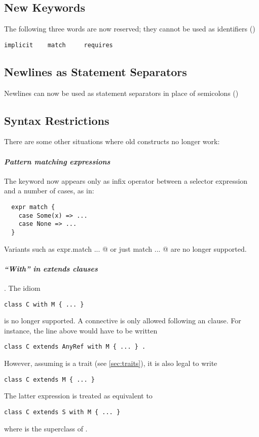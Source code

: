 \subsection*{New Keywords}

The following three words are now reserved; they cannot be used as
identifiers ()
\begin{lstlisting}
implicit    match     requires
\end{lstlisting}

\subsection*{Newlines as Statement Separators}

Newlines can now be used as statement separators in place of
semicolons ()

\subsection*{Syntax Restrictions}

There are some other situations where old constructs no longer work:

\paragraph{\em Pattern matching expressions} The \lstinline@match@
keyword now appears only as infix operator between a selector
expression and a number of cases, as in:
\begin{lstlisting}
  expr match {
    case Some(x) => ...
    case None => ...
  }
\end{lstlisting}
Variants such as \lstinline@ expr.match {...} @ 
or just
\lstinline@ match {...} @
are no longer supported.

\paragraph{\em ``With'' in extends clauses}. The idiom
\begin{lstlisting}
class C with M { ... }
\end{lstlisting}
is no longer supported. A \lstinline@with@ connective is only allowed
following an \lstinline@extends@ clause. For instance, the line
above would have to be written
\begin{lstlisting}
class C extends AnyRef with M { ... } .
\end{lstlisting}
However, assuming \lstinline@M@ is a trait (see
\ref{sec:traits}), it is also legal to write
\begin{lstlisting}
class C extends M { ... }
\end{lstlisting}
The latter expression is treated as equivalent to
\begin{lstlisting}
class C extends S with M { ... }
\end{lstlisting}
where \lstinline@S@ is the superclass of \lstinline@M@.

